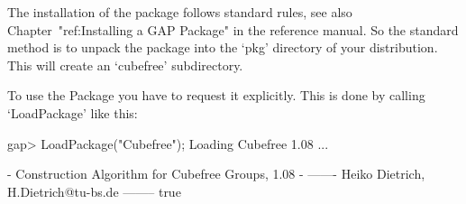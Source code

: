 

\null

The installation of the {\Cubefree} package follows standard {\GAP} rules, see
also 
Chapter~"ref:Installing a GAP Package" in the {\GAP} reference manual.
So the standard method is to unpack the package into the `pkg'
directory  of your {\GAP} distribution.  This will create an `cubefree'
subdirectory. 

\null

To use the {\Cubefree} Package you have to request it explicitly. This  is
done by calling `LoadPackage' like this:

\beginexample
gap> LoadPackage("Cubefree");
Loading Cubefree 1.08 ...

   - Construction Algorithm for Cubefree Groups, 1.08 -
   ------- Heiko Dietrich, H.Dietrich@tu-bs.de --------
true
\endexample


